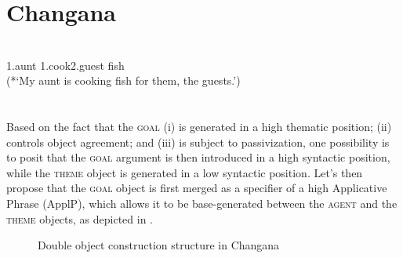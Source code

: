 \documentclass[output=paper]{langsci/langscibook}
\begin{document}
\chapter[Changana]{Changana}
\label{bkm:Ref455885678}\gll *\\
     1.aunt          1.\textstyleFontepargpadroi{{}-}cook\textstyleFontepargpadroi{{}-}\textstyleFontepargpadroi{{}-}\textstyleFontepargpadroi{       }2.guest             fish\\
\glt (*‘My aunt is cooking fish for them, the guests.’)
\z

\chapter[]{\rmfamily }

Based on the fact that the \textsc{goal} (i) is generated in a high thematic position; (ii) controls object agreement; and (iii) is subject to passivization, one possibility is to posit that the \textsc{goal} argument is then introduced in a high syntactic position, while the \textsc{theme} object is generated in a low syntactic position. Let’s then propose that the \textsc{goal} object is first merged as a specifier of a high Applicative Phrase (ApplP), which allows it to be base-generated between the \textsc{agent} and the \textsc{theme} objects, as depicted in .

  
 

\begin{stylecaption}\begin{figure}
\caption{Double object construction structure in Changana}
\label{fig:3}
\end{figure}\end{stylecaption}
\end{document}
